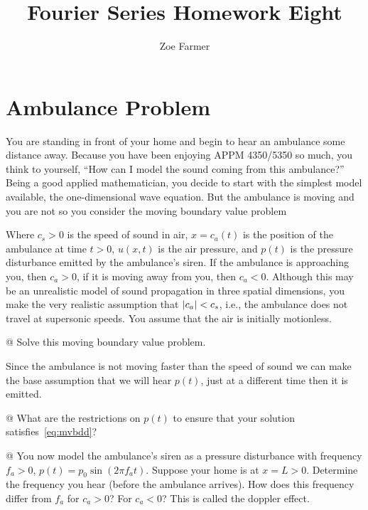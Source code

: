 \documentclass[10pt]{article}
\title{Fourier Series Homework Eight}
\author{Zoe Farmer}
\begin{document}
\maketitle

\section{Ambulance Problem}

You are standing in front of your home and begin to hear an ambulance some distance away. Because you have been enjoying
APPM 4350/5350 so much, you think to yourself, ``How can I model the sound coming from this ambulance?'' Being a good
applied mathematician, you decide to start with the simplest model available, the one-dimensional wave equation. But the
ambulance is moving and you are not so you consider the moving boundary value problem

\label{eq:mvbdd}

Where $c_s > 0$ is the speed of sound in air, $x = c_a(t)$ is the position of the ambulance at time $t > 0$, $u(x, t)$ is
the air pressure, and $p(t)$ is the pressure disturbance emitted by the ambulance's siren. If the ambulance is
approaching you, then $c_a > 0$, if it is moving away from you, then $c_a < 0$. Although this may be an unrealistic
model of sound propagation in three spatial dimensions, you make the very realistic assumption that $\left\lvert c_a \right\rvert < c_s$,
i.e., the ambulance does not travel at supersonic speeds. You assume that the air is initially motionless.

\begin{easylist}[enumerate]
    @ Solve this moving boundary value problem.

    Since the ambulance is not moving faster than the speed of sound we can make the base assumption that we will hear
    $p(t)$, just at a different time then it is emitted.

    @ What are the restrictions on $p(t)$ to ensure that your solution satisfies~\eqref{eq:mvbdd}?

    @ You now model the ambulance's siren as a pressure disturbance with frequency $f_a > 0$, $p(t)=p_0\sin(2\pi f_at)$.
    Suppose your home is at $x = L > 0$. Determine the frequency you hear (before the ambulance arrives). How does this
    frequency differ from $f_a$ for $c_a > 0$? For $c_a < 0$? This is called the doppler effect.
\end{easylist}
\end{document}
